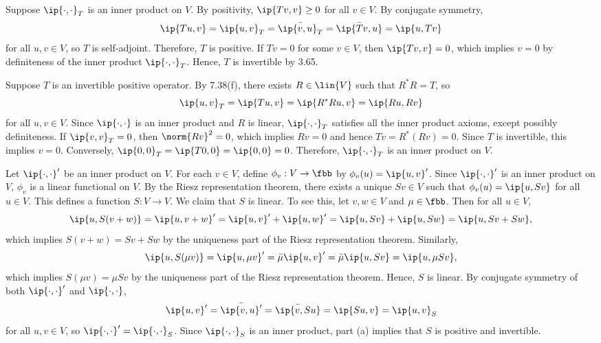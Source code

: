 \begin{solenum}
    \item \rightimp Suppose $\ip{\cdot, \cdot}_T$ is an inner product on $V$.
    By positivity, $\ip{Tv, v} \geq 0$ for all $v \in V$.
    By conjugate symmetry,
    \[
        \ip{Tu, v} = \ip{u, v}_T = \bar{\ip{v, u}_T} = \bar{\ip{Tv, u}} = \ip{u, Tv}
    \]
    for all $u, v \in V$, so $T$ is self-adjoint.
    Therefore, $T$ is positive.
    If $T v = 0$ for some $v \in V$, then $\ip{Tv, v} = 0$, which implies $v = 0$ by definiteness of the inner product $\ip{\cdot, \cdot}_T$.
    Hence, $T$ is invertible by 3.65.

    \leftimp Suppose $T$ is an invertible positive operator.
    By 7.38(f), there exists $R \in \lin{V}$ such that $R^\ast R = T$, so
    \[
        \ip{u, v}_T = \ip{Tu, v} = \ip{R^\ast R u, v} = \ip{Ru, Rv}
    \]
    for all $u, v \in V$.
    Since $\ip{\cdot, \cdot}$ is an inner product and $R$ is linear, $\ip{\cdot, \cdot}_T$ satisfies all the inner product axioms, except possibly definiteness.
    If $\ip{v, v}_T = 0$, then $\norm{Rv}^2 = 0$, which implies $Rv = 0$ and hence $Tv = R^\ast(Rv) = 0$.
    Since $T$ is invertible, this implies $v = 0$.
    Conversely, $\ip{0, 0}_T = \ip{T0, 0} = \ip{0, 0} = 0$.
    Therefore, $\ip{\cdot, \cdot}_T$ is an inner product on $V$.
    \item Let $\ip{\cdot, \cdot}'$ be an inner product on $V$.
    For each $v \in V$, define $\phi_v : V \to \fbb$ by $\phi_v(u) = \ip{u, v}'$.
    Since $\ip{\cdot, \cdot}'$ is an inner product on $V$, $\phi_v$ is a linear functional on $V$.
    By the Riesz representation theorem, there exists a unique $Sv \in V$ such that $\phi_v(u) = \ip{u, Sv}$ for all $u \in V$.
    This defines a function $S : V \to V$.
    We claim that $S$ is linear.
    To see this, let $v, w \in V$ and $\mu \in \fbb$. Then for all $u \in V$,
    \[
        \ip{u, S(v + w)} = \ip{u, v + w}' = \ip{u, v}' + \ip{u, w}' = \ip{u, Sv} + \ip{u, Sw} = \ip{u, Sv + Sw},
    \]
    which implies $S(v + w) = Sv + Sw$ by the uniqueness part of the Riesz representation theorem.
    Similarly,
    \[
        \ip{u, S(\mu v)} = \ip{u, \mu v}' = \bar\mu \ip{u, v}' = \bar\mu \ip{u, Sv} = \ip{u, \mu Sv},
    \]
    which implies $S(\mu v) = \mu Sv$ by the uniqueness part of the Riesz representation theorem.
    Hence, $S$ is linear.
    By conjugate symmetry of both $\ip{\cdot, \cdot}'$ and $\ip{\cdot, \cdot}$, 
    \[
        \ip{u, v}' = \bar{\ip{v, u}'} = \bar{\ip{v, Su}} = \ip{Su, v} = \ip{u, v}_S
    \]
    for all $u, v \in V$, so $\ip{\cdot, \cdot}' = \ip{\cdot, \cdot}_S$.
    Since $\ip{\cdot, \cdot}_S$ is an inner product, part (a) implies that $S$ is positive and invertible.
\end{solenum}


